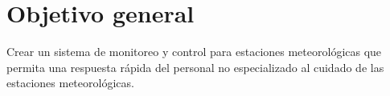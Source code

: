 \section{Objetivo general}

Crear un sistema de monitoreo y control para estaciones meteorológicas que permita una respuesta rápida del personal no especializado al cuidado de las estaciones meteorológicas.
